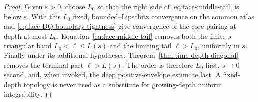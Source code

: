 \documentclass[11pt]{article}
\begin{document}
\begin{proof}
Given $\varepsilon>0$, choose $L_0$ so that the right side of
\eqref{eq:face-middle-tail} is below $\varepsilon$.  With this $L_0$ fixed,
bounded--Lipschitz convergence on the common atlas and
\eqref{eq:face-DQ-boundary-tightness} give convergence of the core pairing
at depth at most $L_0$.  Equation~\eqref{eq:face-middle-tail} removes both
the finite-$s$ triangular band $L_0<\ell\le L(s)$ and the limiting tail
$\ell>L_0$, uniformly in $s$.  Finally
under its additional hypotheses,
Theorem~\ref{thm:time-depth-diagonal} removes the terminal part
$\ell>L(s)$.  The order is therefore $L_0$ first, $s\to0$ second, and,
when invoked, the deep positive-envelope estimate last.  A fixed-depth topology is never used
as a substitute for growing-depth uniform integrability.
\end{proof}
\end{document}
